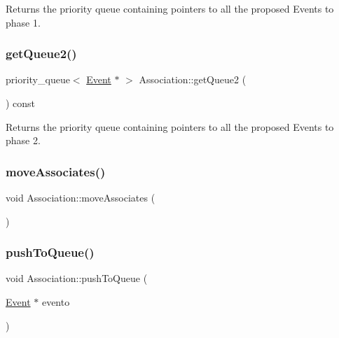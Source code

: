 Returns the priority queue containing pointers to all the proposed Events to phase 1. 

\mbox{\label{classAssociation_a1600f284c97b98836cac69fc4b21d5f6}} 
\subsubsection{\texorpdfstring{get\+Queue2()}{getQueue2()}}
{\footnotesize\ttfamily priority\+\_\+queue$<$ \mbox{\hyperlink{classEvent}{Event}} $\ast$ $>$ Association\+::get\+Queue2 (\begin{DoxyParamCaption}{ }\end{DoxyParamCaption}) const}



Returns the priority queue containing pointers to all the proposed Events to phase 2. 

\mbox{\label{classAssociation_ae3c5683c5fb9d62f5bf2b9d38be3c8dc}} 
\subsubsection{\texorpdfstring{move\+Associates()}{moveAssociates()}}
{\footnotesize\ttfamily void Association\+::move\+Associates (\begin{DoxyParamCaption}{ }\end{DoxyParamCaption})}

\mbox{\label{classAssociation_aaf6b3eabb3b20c31a56f69913cb3fdb3}} 
\subsubsection{\texorpdfstring{push\+To\+Queue()}{pushToQueue()}}
{\footnotesize\ttfamily void Association\+::push\+To\+Queue (\begin{DoxyParamCaption}\item[{\mbox{\hyperlink{classEvent}{Event}} $\ast$}]{evento }\end{DoxyParamCaption})}



